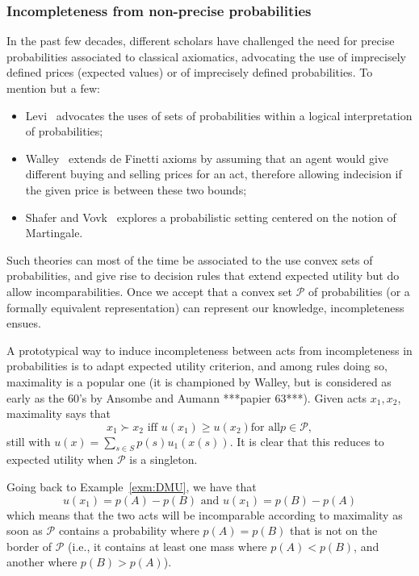 \documentclass[french, english]{llncs}
\begin{document}
	\subsubsection{Incompleteness from non-precise probabilities}
	
	In the past few decades, different scholars have challenged the need for precise probabilities associated to classical axiomatics, advocating the use of imprecisely defined prices (expected values) or of imprecisely defined probabilities. To mention but a few:
	\begin{itemize} 
		\item Levi~\cite{levi_enterprise_1983} advocates the uses of sets of probabilities within a logical interpretation of probabilities;
		\item Walley~\cite{walley_statistical_1991} extends de Finetti axioms by assuming that an agent would give different buying and selling prices for an act, therefore allowing indecision if the given price is between these two bounds;
		\item Shafer and Vovk~\cite{shafer_probability_2005} explores a probabilistic setting centered on the notion of Martingale.
	\end{itemize}
	Such theories can most of the time be associated to the use convex sets of probabilities, and give rise to decision rules that extend expected utility but do allow incomparabilities. Once we accept that a convex set $\mathcal{P}$ of probabilities (or a formally equivalent representation) can represent our knowledge, incompleteness ensues. 
	
	A prototypical way to induce incompleteness between acts from incompleteness in probabilities is to adapt expected utility criterion, and among rules doing so, maximality is a popular one (it is championed by Walley, but is considered as early as the 60's by Ansombe and Aumann ***papier 63***). Given acts $x_1,x_2$, maximality says that 
	$$x_1 \succ x_2 \textrm{ iff }  u(x_1) ≥ u(x_2) \textrm{for all} p \in \mathcal{P},$$
	still with $u(x) = \sum_{s \in S} p(s) u_1(x(s))$. It is clear that this reduces to expected utility when $\mathcal{P}$	is a singleton. 
	
	\begin{example}
		Going back to Example~\ref{exm:DMU}, we have that 
		$$u(x_1)=p(A) - p(B) \textrm{ and } u(x_1)=p(B) - p(A)$$
		which means that the two acts will be incomparable according to maximality as soon as $\mathcal{P}$ contains a probability where $p(A)=p(B)$ that is not on the border of $\mathcal{P}$ (i.e., it contains at least one mass where $p(A)<p(B)$, and another where $p(B)>p(A)$). 
	\end{example}
	
\end{document}
